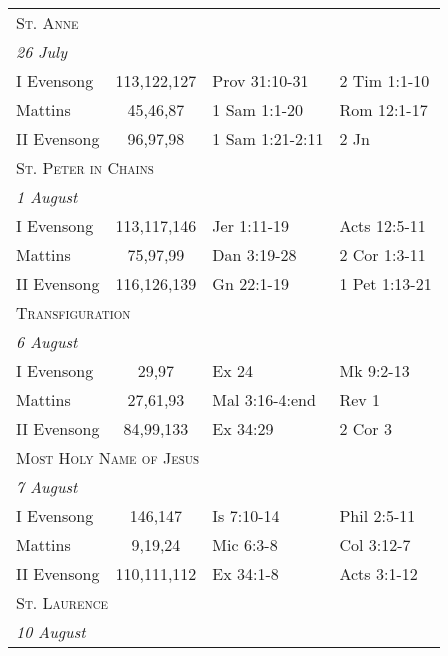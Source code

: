 \begin{longtable}{l c l l}
\multicolumn{4}{l}{\textsc{St. Anne}}\\
\multicolumn{4}{l}{\textit{26 July}}\\
\hspace{1em} I Evensong&113,122,127&Prov 31:10-31&2 Tim 1:1-10\\
\hspace{1em} Mattins&45,46,87&1 Sam 1:1-20&Rom 12:1-17\\
\hspace{1em} II Evensong&96,97,98&1 Sam 1:21-2:11&2 Jn\\
%
\multicolumn{4}{l}{\textsc{St. Peter in Chains}}\\
\multicolumn{4}{l}{\textit{1 August}}\\
\hspace{1em} I Evensong&113,117,146&Jer 1:11-19&Acts 12:5-11\\
\hspace{1em} Mattins&75,97,99&Dan 3:19-28&2 Cor 1:3-11\\
\hspace{1em} II Evensong&116,126,139&Gn 22:1-19&1 Pet 1:13-21\\
%
\multicolumn{4}{l}{\textsc{Transfiguration}}\\
\multicolumn{4}{l}{\textit{6 August}}\\
\hspace{1em} I Evensong&29,97&Ex 24&Mk 9:2-13\\
\hspace{1em} Mattins&27,61,93&Mal 3:16-4:end&Rev 1\\
\hspace{1em} II Evensong&84,99,133&Ex 34:29&2 Cor 3\\
%
\multicolumn{4}{l}{\textsc{Most Holy Name of Jesus}}\\
\multicolumn{4}{l}{\textit{7 August}}\\
\hspace{1em} I Evensong&146,147&Is 7:10-14&Phil 2:5-11\\
\hspace{1em} Mattins&9,19,24&Mic 6:3-8&Col 3:12-7\\
\hspace{1em} II Evensong&110,111,112&Ex 34:1-8&Acts 3:1-12\\
\multicolumn{4}{l}{\textsc{St. Laurence}}\\
\multicolumn{4}{l}{\textit{10 August}}\\

\end{longtable}
